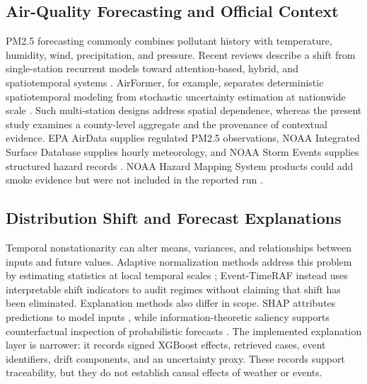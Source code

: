 \subsection{Air-Quality Forecasting and Official Context}
PM2.5 forecasting commonly combines pollutant history with temperature,
humidity, wind, precipitation, and pressure. Recent reviews describe a shift
from single-station recurrent models toward attention-based, hybrid, and
spatiotemporal systems \cite{zhou2024pm25review,zhang2023sparsepm25}. AirFormer,
for example, separates deterministic spatiotemporal modeling from stochastic
uncertainty estimation at nationwide scale \cite{liang2023airformer}. Such
multi-station designs address spatial dependence, whereas the present study
examines a county-level aggregate and the provenance of contextual evidence.
EPA AirData supplies regulated PM2.5 observations, NOAA Integrated Surface
Database supplies hourly meteorology, and NOAA Storm Events supplies structured
hazard records \cite{epaairdata2026,noaaisd2026,noaastormevents2026}. NOAA
Hazard Mapping System products could add smoke evidence but were not included in
the reported run \cite{noaahms2026}.

\subsection{Distribution Shift and Forecast Explanations}
Temporal nonstationarity can alter means, variances, and relationships between
inputs and future values. Adaptive normalization methods address this problem by
estimating statistics at local temporal scales \cite{liu2023san}; Event-TimeRAF
instead uses interpretable shift indicators to audit regimes without claiming
that shift has been eliminated. Explanation methods also differ in scope. SHAP
attributes predictions to model inputs \cite{lundberg2017shap}, while
information-theoretic saliency supports counterfactual inspection of
probabilistic forecasts \cite{raman2023forecast}. The implemented explanation
layer is narrower: it records signed XGBoost effects, retrieved cases, event
identifiers, drift components, and an uncertainty proxy. These records support
traceability, but they do not establish causal effects of weather or events.
